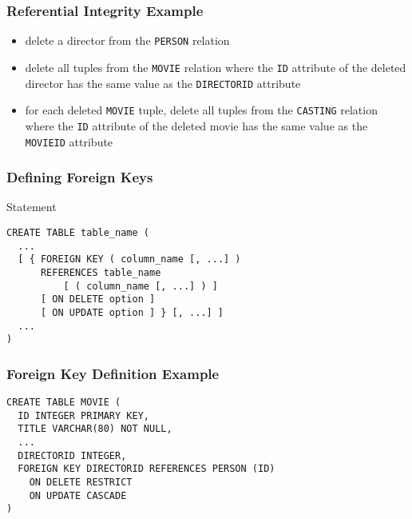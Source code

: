 \documentclass[dvipsnames]{beamer}
\theoremstyle{plain}
\begin{document}
\begin{frame}[fragile]
  \frametitle{Referential Integrity Example}

  \begin{example}
    \begin{itemize}
      \item delete a director from the \texttt{PERSON} relation

      \pause
      \item delete all tuples from the \texttt{MOVIE} relation
        where the \texttt{ID} attribute of the deleted director
        has the same value as the \texttt{DIRECTORID} attribute

      \pause
      \item for each deleted \texttt{MOVIE} tuple, delete all tuples
        from the \texttt{CASTING} relation where the \texttt{ID}
        attribute of the deleted movie has the same value as the
        \texttt{MOVIEID} attribute
    \end{itemize}
  \end{example}
\end{frame}

\begin{frame}[fragile]
  \frametitle{Defining Foreign Keys}

  \begin{block}{Statement}
    \begin{lstlisting}
CREATE TABLE table_name (
  ...
  [ { FOREIGN KEY ( column_name [, ...] )
      REFERENCES table_name
          [ ( column_name [, ...] ) ]
      [ ON DELETE option ]
      [ ON UPDATE option ] } [, ...] ]
  ...
)
    \end{lstlisting}
  \end{block}
\end{frame}

\begin{frame}[fragile]
  \frametitle{Foreign Key Definition Example}

  \begin{example}
    \begin{lstlisting}
CREATE TABLE MOVIE (
  ID INTEGER PRIMARY KEY,
  TITLE VARCHAR(80) NOT NULL,
  ...
  DIRECTORID INTEGER,
  FOREIGN KEY DIRECTORID REFERENCES PERSON (ID)
    ON DELETE RESTRICT
    ON UPDATE CASCADE
)
    \end{lstlisting}
  \end{example}
\end{frame}
\end{document}

